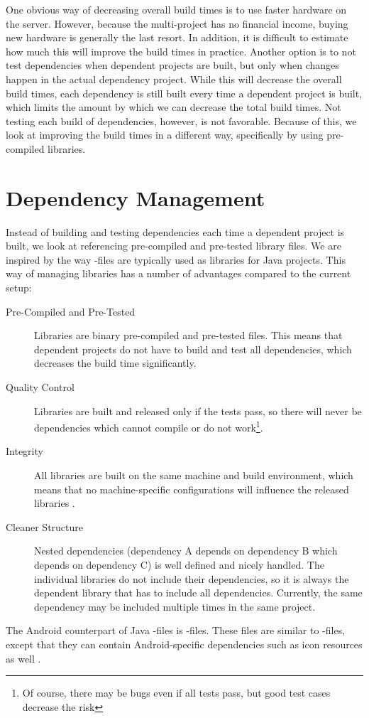 One obvious way of decreasing overall build times is to use faster hardware on the server. However, because the multi-project has no financial income, buying new hardware is generally the last resort. In addition, it is difficult to estimate how much this will improve the build times in practice. Another option is to not test dependencies when dependent projects are built, but only when changes happen in the actual dependency project. While this will decrease the overall build times, each dependency is still built every time a dependent project is built, which limits the amount by which we can decrease the total build times. Not testing each build of dependencies, however, is not favorable. Because of this, we look at improving the build times in a different way, specifically by using pre-compiled libraries.

\section{Dependency Management}\label{sec:dependency_management}
Instead of building and testing dependencies each time a dependent project is built, we look at referencing pre-compiled and pre-tested library files. We are inspired by the way -files are typically used as libraries for Java projects. This way of managing libraries has a number of advantages compared to the current setup:
\begin{description}
  \item [Pre-Compiled and Pre-Tested] Libraries are binary pre-compiled and pre-tested files. This means that dependent projects do not have to build and test all dependencies, which decreases the build time significantly.
  \item[Quality Control] Libraries are built and released only if the tests pass, so there will never be dependencies which cannot compile or do not work\footnote{Of course, there may be bugs even if all tests pass, but good test cases decrease the risk}.
  \item[Integrity] All libraries are built on the same machine and build environment, which means that no machine-specific configurations will influence the released libraries \parencite{humble2010, huttermann2014}.
  \item[Cleaner Structure] Nested dependencies (dependency A depends on dependency B which depends on dependency C) is well defined and nicely handled. The individual libraries do not include their dependencies, so it is always the dependent library that has to include all dependencies. Currently, the same dependency may be included multiple times in the same project.
\end{description}
The Android counterpart of Java -files is -files. These files are similar to -files, except that they can contain Android-specific dependencies such as icon resources as well \parencite{android-aar}.

